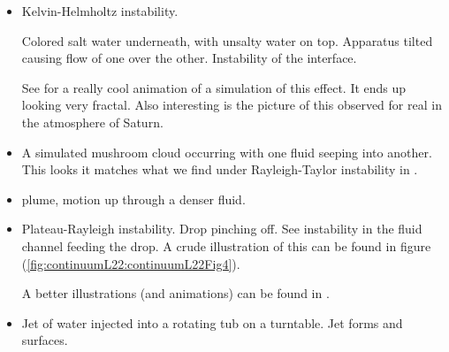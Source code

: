 \begin{itemize}
\item Kelvin-Helmholtz instability.

Colored salt water underneath, with unsalty water on top.  Apparatus tilted causing flow of one over the other.  Instability of the interface.

See \cite{wiki:KelvinHelmholtz} for a really cool animation of a simulation of this effect.  It ends up looking very fractal.  Also interesting is the picture of this observed for real in the atmosphere of Saturn.

\item A simulated mushroom cloud occurring with one fluid seeping into another.  This looks it matches what we find under Rayleigh-Taylor instability in \cite{wiki:RayleighTaylor}.

\item plume, motion up through a denser fluid.

\item Plateau-Rayleigh instability.  Drop pinching off.  See instability in the fluid channel feeding the drop.  A crude illustration of this can be found in figure (\ref{fig:continuumL22:continuumL22Fig4}).


A better illustrations (and animations) can be found in \cite{wiki:PlateauRayleigh}.

\item Jet of water injected into a rotating tub on a turntable.  Jet forms and surfaces.

\end{itemize}

\EndArticle
